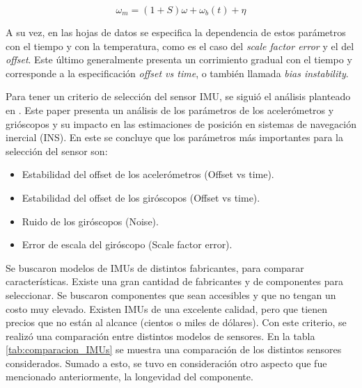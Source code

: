 \begin{equation}
    \omega_m = (1+S)\omega + \omega_b (t) + \eta
    \label{eq:medicion_vs_real}
\end{equation}

A su vez, en las hojas de datos se especifica la dependencia de estos parámetros con el tiempo y con la temperatura, como es el caso del \textit{scale factor error} y el del \textit{offset}. Este último generalmente presenta un corrimiento gradual con el tiempo y corresponde a la especificación \textit{offset vs time}, o también llamada \textit{bias instability}.

Para tener un criterio de selección del sensor IMU, se siguió el análisis planteado en \cite{borodacz2022review}. Este paper presenta un análisis de los parámetros de los acelerómetros y grióscopos y su impacto en las estimaciones de posición en sistemas de navegación inercial (INS). En este se concluye que los parámetros más importantes para la selección del sensor son:

\begin{itemize}
    \item Estabilidad del offset de los acelerómetros (Offset vs time).
    \item Estabilidad del offset de los giróscopos (Offset vs time).
    \item Ruido de los giróscopos (Noise).
    \item Error de escala del giróscopo (Scale factor error).
\end{itemize}

Se buscaron modelos de IMUs de distintos fabricantes, para comparar características. Existe una gran cantidad de fabricantes y de componentes para seleccionar. Se buscaron componentes que sean accesibles y que no tengan un costo muy elevado. Existen IMUs de una excelente calidad, pero que tienen precios que no están al alcance (cientos o miles de dólares). Con este criterio, se realizó una comparación entre distintos modelos de sensores. En la tabla \ref{tab:comparacion_IMUs} se muestra una comparación de los distintos sensores considerados. Sumado a esto, se tuvo en consideración otro aspecto que fue mencionado anteriormente, la longevidad del componente.

